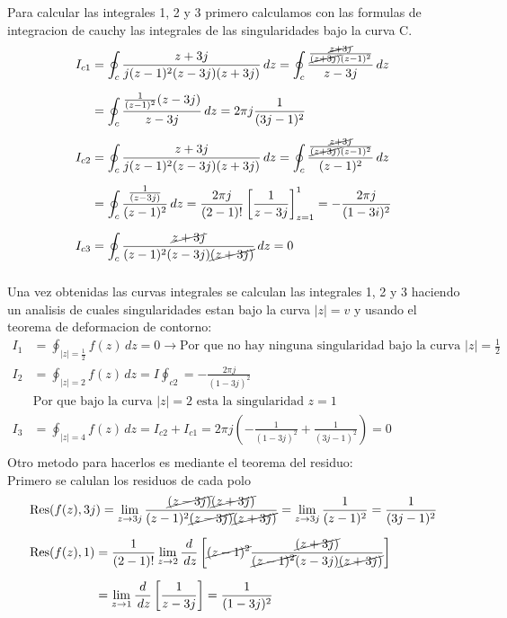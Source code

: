 \documentclass[12pt]{report}
\begin{document}
Para calcular las integrales 1, 2 y 3 primero calculamos con las formulas de integracion de cauchy las integrales de las singularidades bajo la curva C. \\

\begin{align*}
I_{c1} &= \oint_{c}\frac{z+3j}{j(z - 1)^2(z-3j)(z+3j)} \, dz =\oint_{c}\frac{\frac{\cancel{z+3j}}{\cancel{(z+3j)}(z-1)^2}}{z-3j} \, dz\\[6pt]
&= \oint_{c}\frac{\frac{1}{(z-1)^2}(z-3j)}{z-3j} \, dz = 2\pi j \frac{1}{(3j-1)^2}\\[6pt]
I_{c2} &= \oint_{c}\frac{z+3j}{j(z - 1)^2(z-3j)(z+3j)} \, dz =\oint_{c}\frac{\frac{\cancel{z+3j}}{\cancel{(z+3j)}(z-1)^2}}{(z-1)^2} \, dz\\[6pt]
&= \oint_{c}\frac{\frac{1}{(z-3j)}}{(z-1)^2} \, dz = \frac{2\pi j}{(2-1)!} \left[ \frac{1}{z-3j} \right]_{z=1}^1= -\frac{2\pi j}{(1-3i)^2} \\[6pt]
I_{c3} &= \oint_{c}\frac{\cancel{z+3j}}{(z - 1)^2(z-3j)\cancel{(z+3j)}} \, dz=0 \\[6pt]
\end{align*}


Una vez obtenidas las curvas integrales se calculan las integrales 1, 2 y 3 haciendo un analisis de cuales singularidades estan bajo la curva $|z|=v$ y usando el teorema de deformacion de contorno: \\

\begin{align*}
I_1&=\oint_{|z|=\frac{1}{2}}f(z) \, dz= 0 \rightarrow \text{Por que no hay ninguna singularidad bajo la curva $|z|=\frac{1}{2}$}\\[6pt]
I_2&=\oint_{|z|=2}f(z) \, dz = I \oint_{c2} = - \frac{2 \pi j}{(1-3j)^2}\\[6pt]
    &\text{Por que bajo la curva $|z|=2$ esta la singularidad $z=1$}\\[12pt]
I_3&= \oint_{|z|=4}f(z) \, dz = I_{c2}+I_{c1}=2 \pi j \left( -\frac{1}{(1-3j)^2} + \frac{1}{(3j-1)^2} \right) = 0 \\[6pt]
\end{align*}
Otro metodo para hacerlos es mediante el teorema del residuo:\\
Primero se calulan los residuos de cada polo\\
\begin{align*}
&\text{Res}(f(z),3j)= \lim_{z \to 3j} \frac{\cancel{(z-3j)}\cancel{(z+3j)}}{(z-1)^2\cancel{(z-3j)}\cancel{(z+3j)}}= \lim_{z \to 3j} \frac{1}{(z-1)^2}=\frac{1}{(3j-1)^2} \\[6pt]
&\text{Res}(f(z),1)=\frac{1}{(2-1)!} \lim_{z \to 2} \frac{d}{\,dz} \left[ \cancel{(z-1)^2} \frac{\cancel{(z+3j)}}{\cancel{(z-1)^2}(z-3j) \cancel{(z+3j)}} \right]\\[6pt]
&\phantom{\text{Res}(f(z),1)}= \lim_{z \to 1} \frac{d}{\,dz} \left[ \frac{1}{z-3j} \right]= \frac{1}{(1-3j)^2}\\[6pt]
\end{align*}
\end{document}

